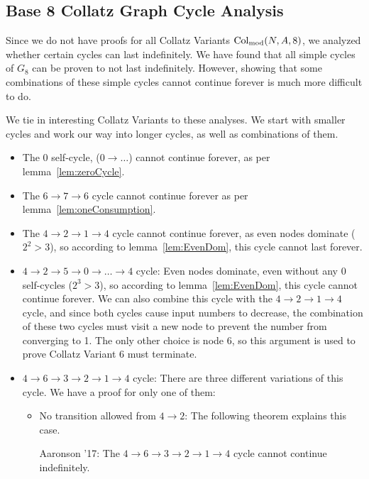 \subsection{Base 8 Collatz Graph Cycle Analysis} \label{subsubsec:cycleanalysis}
Since we do not have proofs for all Collatz Variants $\mathrm{Col}_{\text{mod}}(N,A,8)$, we analyzed whether certain cycles can last indefinitely. We have found that all simple cycles of $G_8$ can be proven to not last indefinitely. However, showing that some combinations of these simple cycles cannot continue forever is much more difficult to do.\par
We tie in interesting Collatz Variants to these analyses. We start with smaller cycles and work our way into longer cycles, as well as combinations of them.
\begin{itemize}
    \item The 0 self-cycle, ($0  \rightarrow \ldots$) cannot continue forever, as per lemma~\ref{lem:zeroCycle}.
    \item The $6 \rightarrow 7 \rightarrow 6$ cycle cannot continue forever as per lemma~\ref{lem:oneConsumption}.
    \item The $4 \rightarrow 2 \rightarrow 1 \rightarrow 4$ cycle cannot continue forever, as even nodes dominate ($2^2 > 3$), so according to lemma~\ref{lem:EvenDom}, this cycle cannot last forever.
    \item $4 \rightarrow 2 \rightarrow 5 \rightarrow 0  \rightarrow \ldots \rightarrow 4$ cycle:  Even nodes dominate, even without any 0 self-cycles ($2^3 > 3$), so according to lemma~\ref{lem:EvenDom}, this cycle cannot continue forever. We can also combine this cycle with the $4 \rightarrow 2 \rightarrow 1 \rightarrow 4$ cycle, and since both cycles cause input numbers to decrease, the combination of these two cycles must visit a new node to prevent the number from converging to 1. The only other choice is node 6, so this argument is used to prove Collatz Variant 6 must terminate.
    \item $4 \rightarrow 6 \rightarrow 3 \rightarrow 2 \rightarrow 1 \rightarrow 4$ cycle: There are three different variations of this cycle. We have a proof for only one of them:
\begin{itemize}
  \item No transition allowed from $4 \rightarrow 2$: The following theorem explains this case.
  \begin{theorem} Aaronson '17: The $4 \rightarrow 6 \rightarrow 3 \rightarrow 2 \rightarrow 1 \rightarrow 4$ cycle cannot continue indefinitely.

\end{theorem}
\end{itemize}
\end{itemize}

